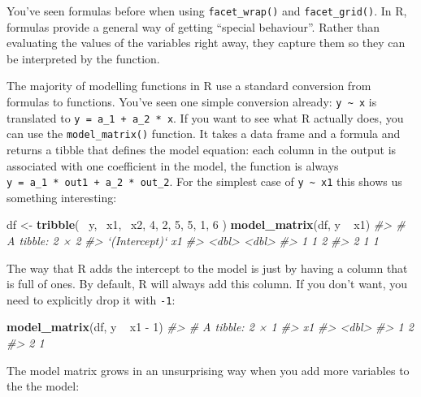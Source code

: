\documentclass[]{book}
\newenvironment{Shaded}{\begin{snugshade}}{\end{snugshade}}
\newcommand{\KeywordTok}[1]{\textcolor[rgb]{0.13,0.29,0.53}{\textbf{{#1}}}}
\newcommand{\DecValTok}[1]{\textcolor[rgb]{0.00,0.00,0.81}{{#1}}}
\newcommand{\StringTok}[1]{\textcolor[rgb]{0.31,0.60,0.02}{{#1}}}
\newcommand{\CommentTok}[1]{\textcolor[rgb]{0.56,0.35,0.01}{\textit{{#1}}}}
\newcommand{\NormalTok}[1]{{#1}}
\begin{document}
You've seen formulas before when using \texttt{facet\_wrap()} and
\texttt{facet\_grid()}. In R, formulas provide a general way of getting
``special behaviour''. Rather than evaluating the values of the
variables right away, they capture them so they can be interpreted by
the function.

The majority of modelling functions in R use a standard conversion from
formulas to functions. You've seen one simple conversion already:
\texttt{y\ \textasciitilde{}\ x} is translated to
\texttt{y\ =\ a\_1\ +\ a\_2\ *\ x}. If you want to see what R actually
does, you can use the \texttt{model\_matrix()} function. It takes a data
frame and a formula and returns a tibble that defines the model
equation: each column in the output is associated with one coefficient
in the model, the function is always
\texttt{y\ =\ a\_1\ *\ out1\ +\ a\_2\ *\ out\_2}. For the simplest case
of \texttt{y\ \textasciitilde{}\ x1} this shows us something
interesting:

\begin{Shaded}
\begin{Highlighting}[]
\NormalTok{df <-}\StringTok{ }\KeywordTok{tribble}\NormalTok{(}
  \NormalTok{~y, ~x1, ~x2,}
  \DecValTok{4}\NormalTok{, }\DecValTok{2}\NormalTok{, }\DecValTok{5}\NormalTok{,}
  \DecValTok{5}\NormalTok{, }\DecValTok{1}\NormalTok{, }\DecValTok{6}
\NormalTok{)}
\KeywordTok{model_matrix}\NormalTok{(df, y ~}\StringTok{ }\NormalTok{x1)}
\CommentTok{#> # A tibble: 2 × 2}
\CommentTok{#>   `(Intercept)`    x1}
\CommentTok{#>           <dbl> <dbl>}
\CommentTok{#> 1             1     2}
\CommentTok{#> 2             1     1}
\end{Highlighting}
\end{Shaded}

The way that R adds the intercept to the model is just by having a
column that is full of ones. By default, R will always add this column.
If you don't want, you need to explicitly drop it with \texttt{-1}:

\begin{Shaded}
\begin{Highlighting}[]
\KeywordTok{model_matrix}\NormalTok{(df, y ~}\StringTok{ }\NormalTok{x1 -}\StringTok{ }\DecValTok{1}\NormalTok{)}
\CommentTok{#> # A tibble: 2 × 1}
\CommentTok{#>      x1}
\CommentTok{#>   <dbl>}
\CommentTok{#> 1     2}
\CommentTok{#> 2     1}
\end{Highlighting}
\end{Shaded}

The model matrix grows in an unsurprising way when you add more
variables to the the model:
\end{document}

